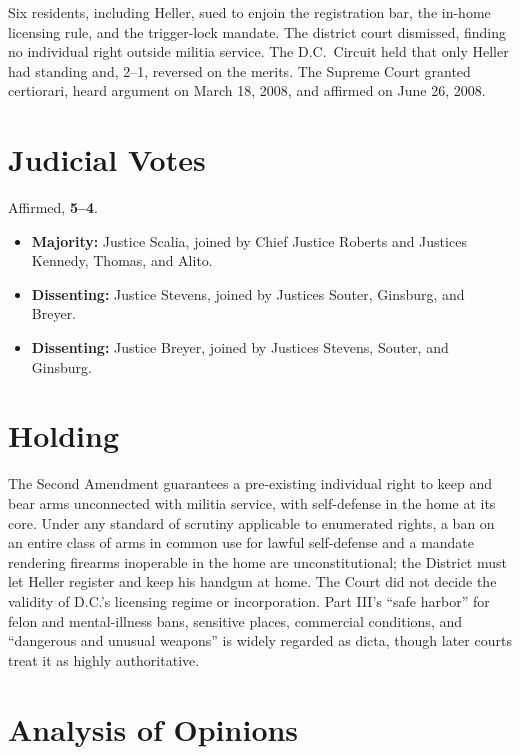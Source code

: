 \documentclass[12pt]{article}
\begin{document}
Six residents, including Heller, sued to enjoin the registration bar, the in-home licensing rule, and the trigger-lock mandate. The district court dismissed, finding no individual right outside militia service. The D.C.\ Circuit held that only Heller had standing and, 2--1, reversed on the merits. The Supreme Court granted certiorari, heard argument on March 18, 2008, and affirmed on June 26, 2008.

\section{Judicial Votes}

Affirmed, \textbf{5--4}.
\begin{itemize}
\item \textbf{Majority:} Justice Scalia, joined by Chief Justice Roberts and Justices Kennedy, Thomas, and Alito.
\item \textbf{Dissenting:} Justice Stevens, joined by Justices Souter, Ginsburg, and Breyer.
\item \textbf{Dissenting:} Justice Breyer, joined by Justices Stevens, Souter, and Ginsburg.
\end{itemize}

\section{Holding}

The Second Amendment guarantees a pre-existing individual right to keep and bear arms unconnected with militia service, with self-defense in the home at its core. Under any standard of scrutiny applicable to enumerated rights, a ban on an entire class of arms in common use for lawful self-defense and a mandate rendering firearms inoperable in the home are unconstitutional; the District must let Heller register and keep his handgun at home. The Court did not decide the validity of D.C.'s licensing regime or incorporation. Part III's ``safe harbor'' for felon and mental-illness bans, sensitive places, commercial conditions, and ``dangerous and unusual weapons'' is widely regarded as dicta, though later courts treat it as highly authoritative.

\section{Analysis of Opinions}
\end{document}
